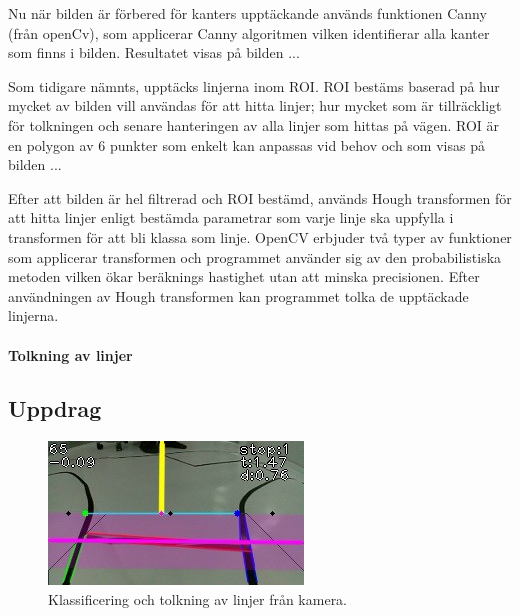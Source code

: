 \documentclass[tekniskrapport/tech.tex]{subfiles}
\begin{document}
Nu när bilden är förbered för kanters upptäckande används funktionen Canny (från openCv), som applicerar Canny algoritmen vilken identifierar alla kanter som finns i bilden. Resultatet visas på bilden ... 

Som tidigare nämnts, upptäcks linjerna inom ROI. ROI bestäms baserad på hur mycket av bilden vill användas för att hitta linjer; hur mycket som är tillräckligt för tolkningen och senare hanteringen av alla linjer som hittas på vägen. ROI är en polygon av 6 punkter som enkelt kan anpassas vid behov och som visas på bilden ...   

Efter att bilden är hel filtrerad och ROI bestämd, används Hough transformen för att hitta linjer enligt bestämda parametrar som varje linje ska uppfylla i transformen för att bli klassa som linje. OpenCV erbjuder två typer av funktioner som applicerar transformen och programmet använder sig av den probabilistiska metoden vilken ökar beräknings hastighet utan att minska precisionen. Efter användningen av Hough transformen kan programmet tolka de upptäckade linjerna.

  
\paragraph{Tolkning av linjer}

\subsection{Uppdrag}

\begin{figure}
    \begin{center}
        \includegraphics[width=\linewidth]{tekniskrapport/figures/opencv.jpg}
    \end{center}
    \caption{Klassificering och tolkning av linjer från kamera.}
\end{figure}
\end{document}
